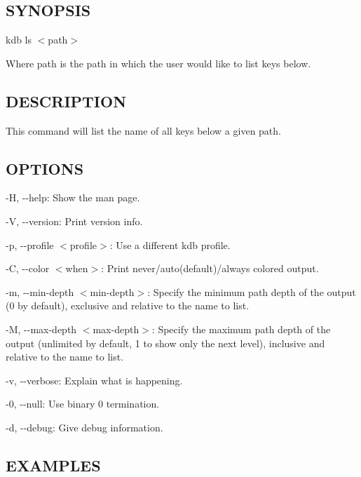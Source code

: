 \subsection*{S\+Y\+N\+O\+P\+S\+IS}

{\ttfamily kdb ls $<$path$>$}

Where {\ttfamily path} is the path in which the user would like to list keys below.

\subsection*{D\+E\+S\+C\+R\+I\+P\+T\+I\+ON}

This command will list the name of all keys below a given path.

\subsection*{O\+P\+T\+I\+O\+NS}


\begin{DoxyItemize}
\item {\ttfamily -\/H}, {\ttfamily -\/-\/help}\+: Show the man page.
\item {\ttfamily -\/V}, {\ttfamily -\/-\/version}\+: Print version info.
\item {\ttfamily -\/p}, {\ttfamily -\/-\/profile $<$profile$>$}\+: Use a different kdb profile.
\item {\ttfamily -\/C}, {\ttfamily -\/-\/color $<$when$>$}\+: Print never/auto(default)/always colored output.
\item {\ttfamily -\/m}, {\ttfamily -\/-\/min-\/depth $<$min-\/depth$>$}\+: Specify the minimum path depth of the output (0 by default), exclusive and relative to the name to list.
\item {\ttfamily -\/M}, {\ttfamily -\/-\/max-\/depth $<$max-\/depth$>$}\+: Specify the maximum path depth of the output (unlimited by default, 1 to show only the next level), inclusive and relative to the name to list.
\item {\ttfamily -\/v}, {\ttfamily -\/-\/verbose}\+: Explain what is happening.
\item {\ttfamily -\/0}, {\ttfamily -\/-\/null}\+: Use binary 0 termination.
\item {\ttfamily -\/d}, {\ttfamily -\/-\/debug}\+: Give debug information.
\end{DoxyItemize}

\subsection*{E\+X\+A\+M\+P\+L\+ES}


